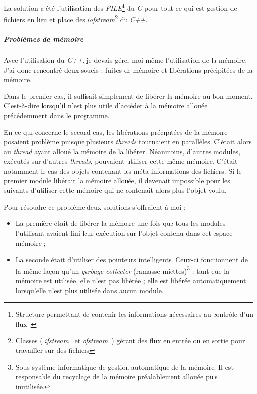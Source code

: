 \documentclass[a4paper,10pt, twoside]{report}
\begin{document}
\begin{spacing}{1.2}
La solution a été l'utilisation des \textit{FILE}\footnote{Structure permettant
de contenir les informations nécessaires au contrôle d'un flux~\cite{refFILE}}
du \textit{C} pour tout ce qui est gestion de fichiers en lieu et place des
\textit{iofstream}\footnote{Classes ( \textit{ifstream}~\cite{refIFS} et
\textit{ofstream}~\cite{refOFS}) gérant des flux en entrée ou en sortie pour
travailler sur des fichiers} du \textit{C++}.

\subparagraph{Problèmes de mémoire}

\bigskip

Avec l'utilisation du \textit{C++}, je devais gérer moi-même l'utilisation de
la mémoire. J'ai donc rencontré deux soucis : fuites de mémoire et libérations
précipitées de la mémoire.

Dans le premier cas, il suffisait simplement de libérer la mémoire au bon
moment. C'est-à-dire lorsqu'il n'est plus utile d'accéder à la mémoire allouée
précédemment dans le programme.

En ce qui concerne le second cas, les libérations précipitées de la mémoire
posaient problème puisque plusieurs \textit{threads} tournaient en parallèles.
C'était alors au \textit{thread} ayant alloué la mémoire de la libérer.
Néanmoins, d'autres modules, exécutés sur d'autres \textit{threads}, pouvaient
utiliser cette même mémoire. C'était notamment le cas des objets contenant les
méta-informations des fichiers. Si le premier module libérait la mémoire
allouée, il devenait impossible pour les suivants d'utiliser cette mémoire qui
ne contenait alors plus l'objet voulu.

Pour résoudre ce problème deux solutions s'offraient à moi :

\begin{itemize}
 \item La première était de libérer la mémoire une fois que tous les modules
 l'utilisant avaient fini leur exécution sur l'objet contenu dans cet espace
 mémoire ;
 \item La seconde était d'utiliser des pointeurs intelligents. Ceux-ci
 fonctionnent de la même façon qu'un \textit{garbage collector}
 (ramasse-miettes)\footnote{Sous-système informatique de gestion automatique
 de la mémoire. Il est responsable du recyclage de la mémoire préalablement
 allouée puis inutilisée.} : tant que la mémoire est utilisée, elle n'est pas
 libérée ; elle est libérée automatiquement lorsqu'elle n'est plus utilisée
 dans aucun module.
\end{itemize}


\end{spacing}
\end{document}
